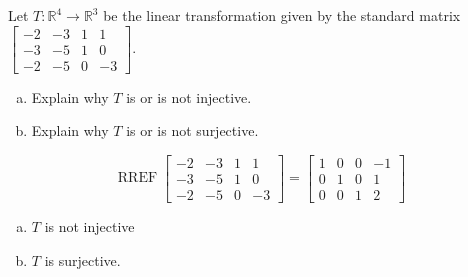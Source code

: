 
\begin{exerciseStatement}
 Let \(T:\mathbb{R}^ 4  \to \mathbb{R}^ 3 \) be the linear transformation given by the standard matrix \( \left[\begin{array}{cccc}
-2 & -3 & 1 & 1 \\
-3 & -5 & 1 & 0 \\
-2 & -5 & 0 & -3
\end{array}\right] .\)
\begin{enumerate}[(a)]
\item Explain why \(T\) is or is not injective.
\item Explain why \(T\) is or is not surjective.
\end{enumerate}
    
\end{exerciseStatement}
    
\begin{exerciseAnswer} 


\[\operatorname{RREF} \left[\begin{array}{cccc}
-2 & -3 & 1 & 1 \\
-3 & -5 & 1 & 0 \\
-2 & -5 & 0 & -3
\end{array}\right] = \left[\begin{array}{cccc}
1 & 0 & 0 & -1 \\
0 & 1 & 0 & 1 \\
0 & 0 & 1 & 2
\end{array}\right] \]


\begin{enumerate}[(a)]
\item \(T\) is not injective
\item \(T\) is surjective.
\end{enumerate}
    
\end{exerciseAnswer}
    
